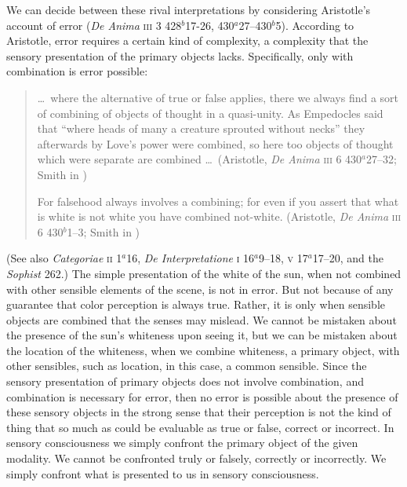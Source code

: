 We can decide between these rival interpretations by considering Aristotle's account of error (\emph{De Anima} \textsc{iii} 3 428\( ^{b} \)17-26, 430\( ^{a} \)27--430\( ^{b} \)5). According to Aristotle, error requires a certain kind of complexity, a complexity that the sensory presentation of the primary objects lacks. Specifically, only with combination is error possible:
\begin{quote}
	\ldots\ where the alternative of true or false applies, there we always find a sort of combining of objects of thought in a quasi-unity. As Empedocles said that ``where heads of many a creature sprouted without necks'' they afterwards by Love’s power were combined, so here too objects of thought which were separate are combined \ldots\ (Aristotle, \emph{De Anima} \textsc{iii} 6 430\( ^{a} \)27--32; Smith in \citealt[54]{Barnes:1984uq})
	
	For falsehood always involves a combining; for even if you assert that what is white is not white you have combined not-white. (Aristotle, \emph{De Anima} \textsc{iii} 6 430\( ^{b} \)1--3; Smith in \citealt[54]{Barnes:1984uq})
\end{quote}
(See also \emph{Categoriae} \textsc{ii} 1\( ^{a} \)16, \emph{De Interpretatione} \textsc{i} 16\( ^{a} \)9--18, \textsc{v} 17\( ^{a} \)17--20, and the \emph{Sophist} 262.) The simple presentation of the white of the sun, when not combined with other sensible elements of the scene, is not in error. But not because of any guarantee that color perception is always true. Rather, it is only when sensible objects are combined that the senses may mislead. We cannot be mistaken about the presence of the sun's whiteness upon seeing it, but we can be mistaken about the location of the whiteness, when we combine whiteness, a primary object, with other sensibles, such as location, in this case, a common sensible. Since the sensory presentation of primary objects does not involve combination, and combination is necessary for error, then no error is possible about the presence of these sensory objects in the strong sense that their perception is not the kind of thing that so much as could be evaluable as true or false, correct or incorrect. In sensory consciousness we simply confront the primary object of the given modality. We cannot be confronted truly or falsely, correctly or incorrectly. We simply confront what is presented to us in sensory consciousness. 

